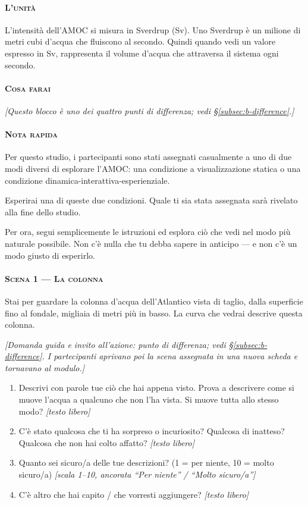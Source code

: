 \paragraph{\textsc{L'unità}}
L'intensità dell'AMOC si misura in Sverdrup (Sv). Uno Sverdrup è un milione di metri cubi d'acqua
che fluiscono al secondo. Quindi quando vedi un valore espresso in Sv, rappresenta il volume d'acqua
che attraversa il sistema ogni secondo.

\paragraph{\textsc{Cosa farai}}
\emph{[Questo blocco è uno dei quattro punti di differenza; vedi \S\ref{subsec:b-difference}.]}

\paragraph{\textsc{Nota rapida}}
Per questo studio, i partecipanti sono stati assegnati casualmente a uno di due modi diversi di
esplorare l'AMOC: una condizione a visualizzazione statica o una condizione
dinamica-interattiva-esperienziale.

Esperirai una di queste due condizioni. Quale ti sia stata assegnata sarà rivelato alla fine dello
studio.

Per ora, segui semplicemente le istruzioni ed esplora ciò che vedi nel modo più naturale possibile.
Non c'è nulla che tu debba sapere in anticipo --- e non c'è un modo giusto di esperirlo.

\paragraph{\textsc{Scena 1 --- La colonna}}
Stai per guardare la colonna d'acqua dell'Atlantico vista di taglio, dalla superficie fino al
fondale, migliaia di metri più in basso. La curva che vedrai descrive questa colonna.

\emph{[Domanda guida e invito all'azione: punto di differenza; vedi \S\ref{subsec:b-difference}. I
partecipanti aprivano poi la scena assegnata in una nuova scheda e tornavano al modulo.]}

\begin{enumerate}[leftmargin=2.2em, itemsep=3pt, start=7]
\item Descrivi con parole tue ciò che hai appena visto. Prova a descrivere come si muove l'acqua a
      qualcuno che non l'ha vista. Si muove tutta allo stesso modo? \emph{[testo libero]}
\item C'è stato qualcosa che ti ha sorpreso o incuriosito? Qualcosa di inatteso? Qualcosa che non
      hai colto affatto? \emph{[testo libero]}
\item Quanto sei sicuro/a delle tue descrizioni? (1 = per niente, 10 = molto sicuro/a)
      \emph{[scala 1--10, ancorata ``Per niente'' / ``Molto sicuro/a'']}
\item C'è altro che hai capito / che vorresti aggiungere? \emph{[testo libero]}
\end{enumerate}

